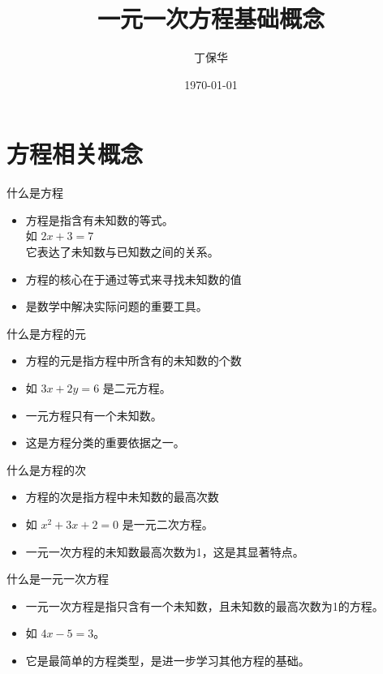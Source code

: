 \documentclass{ctexbeamer}
\title{一元一次方程基础概念}
\author{丁保华}
\date{\today}
\begin{document}
\begin{frame}
  \titlepage
\end{frame}

\section{方程相关概念}

\begin{frame}{什么是方程}
  \begin{itemize}
    \item 方程是指含有未知数的等式。\\
    如 \(2x + 3 = 7\) \\
    它表达了未知数与已知数之间的关系。
    \item 方程的核心在于通过等式来寻找未知数的值
    \item 是数学中解决实际问题的重要工具。
  \end{itemize}
\end{frame}

\begin{frame}{什么是方程的元}
  \begin{itemize}
    \item 方程的元是指方程中所含有的未知数的个数
    \item 如 \(3x + 2y = 6\) 是二元方程。
    \item 一元方程只有一个未知数。
    \item 这是方程分类的重要依据之一。
  \end{itemize}
\end{frame}

\begin{frame}{什么是方程的次}
  \begin{itemize}
    \item 方程的次是指方程中未知数的最高次数
    \item 如 \(x^2 + 3x + 2 = 0\) 是一元二次方程。
    \item 一元一次方程的未知数最高次数为1，这是其显著特点。
  \end{itemize}
\end{frame}

\begin{frame}{什么是一元一次方程}
  \begin{itemize}
    \item 一元一次方程是指只含有一个未知数，且未知数的最高次数为1的方程。
    \item 如 \(4x - 5 = 3\)。
    \item 它是最简单的方程类型，是进一步学习其他方程的基础。
  \end{itemize}
\end{frame}
\end{document}
